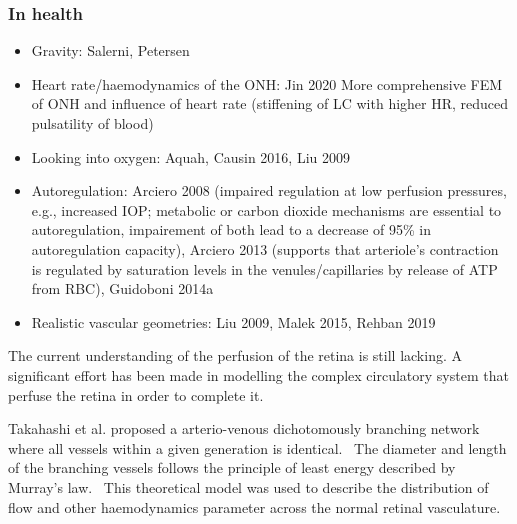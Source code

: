 \documentclass[12pt,a4paper]{journal}
\begin{document}
\subsubsection*{In health}

\begin{itemize}
\item Gravity: Salerni, Petersen
\item Heart rate/haemodynamics of the ONH: Jin 2020 More comprehensive FEM of ONH and influence of heart rate (stiffening of LC with higher HR, reduced pulsatility of blood)
\item Looking into oxygen: Aquah, Causin 2016, Liu 2009
\item Autoregulation: Arciero 2008 (impaired regulation at low perfusion pressures, e.g., increased IOP; metabolic or carbon dioxide mechanisms are essential to autoregulation, impairement of both lead to a decrease of 95\% in autoregulation capacity), Arciero 2013 (supports that arteriole's contraction is regulated by saturation levels in the venules/capillaries by release of ATP from RBC), Guidoboni 2014a
\item Realistic vascular geometries: Liu 2009, Malek 2015, Rehban 2019
\end{itemize}

The current understanding of the perfusion of the retina is still lacking.
A significant effort has been made in modelling the complex circulatory system that perfuse the retina in order to complete it.

Takahashi et al. proposed a arterio-venous dichotomously branching network where all vessels within a given generation is identical.~\cite{Takahashi_2009}
The diameter and length of the branching vessels follows the principle of least energy described by Murray's law.~\cite{Murray_1926}
This theoretical model was used to describe the distribution of flow and other haemodynamics parameter across the normal retinal vasculature.
\end{document}
